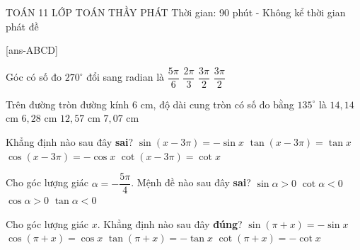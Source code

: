 \begin{name}
	{\tenchude}
	{TOÁN 11}
	{LỚP TOÁN THẦY PHÁT}
	{Thời gian: 90 phút - Không kể thời gian phát đề}
\end{name}

\caulc

[ans-ABCD]


\begin{ex}%
	Góc có số đo $270^\circ$ đổi sang radian là
	\choice
	{$\dfrac{5\pi}{6}$}
	{$\dfrac{2\pi}{3}$}
	{$\dfrac{3\pi}{2}$}
	{\True $\dfrac{3\pi}{2}$}
\end{ex}

\begin{ex}%
	Trên đường tròn đường kính $6$ cm, độ dài cung tròn có số đo bằng $135^\circ$ là
	\choice
	{$14{,}14$ cm}
	{$6{,}28$ cm}
	{$12{,}57$ cm}
	{\True $7{,}07$ cm}
\end{ex}

\begin{ex}%
	Khẳng định nào sau đây \textbf{sai}?
	\choice
	{$\sin(x-3\pi)=-\sin x$}
	{$\tan(x-3\pi)=\tan x$}
	{$\cos(x-3\pi)=-\cos x$}
	{$\cot(x-3\pi)=\cot x$}
\end{ex}

\begin{ex}%
	Cho góc lượng giác $\alpha=-\dfrac{5\pi}{4}$. Mệnh đề nào sau đây \textbf{sai}?
	\choice
	{$\sin\alpha>0$}
	{$\cot\alpha<0$}
	{\True $\cos\alpha>0$}
	{$\tan\alpha<0$}
\end{ex}

\begin{ex}%
	Cho góc lượng giác $x$. Khẳng định nào sau đây \textbf{đúng}?
	\choice
	{\True $\sin(\pi+x)=-\sin x$}
	{$\cos(\pi+x)=\cos x$}
	{$\tan(\pi+x)=-\tan x$}
	{$\cot(\pi+x)=-\cot x$}
\end{ex}

